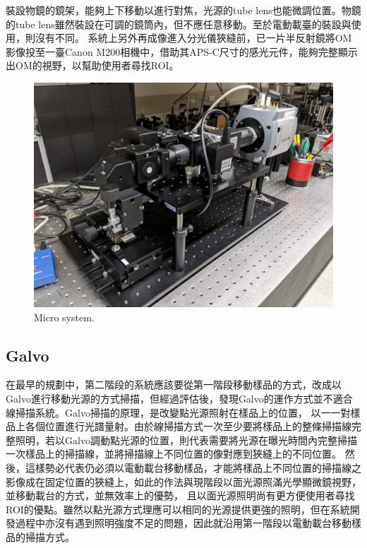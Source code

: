 \documentclass[12pt]{article}
\begin{document}
    裝設物鏡的鏡架，能夠上下移動以進行對焦，光源的tube lens也能微調位置。物鏡的tube lens雖然裝設在可調的鏡筒內，但不應任意移動。至於電動載臺的裝設與使用，則沒有不同。
    系統上另外再成像進入分光儀狹縫前，已一片半反射鏡將OM影像投至一臺Canon M200相機中，借助其APS-C尺寸的感光元件，能夠完整顯示出OM的視野，以幫助使用者尋找ROI。
    \begin{figure}
        \centering
        \includegraphics[width=\linewidth]{PXL_20210831_081957648.jpg}
        \caption{Micro system.}
    \end{figure}

    \subsection{Galvo}
    在最早的規劃中，第二階段的系統應該要從第一階段移動樣品的方式，改成以Galvo進行移動光源的方式掃描，但經過評估後，發現Galvo的運作方式並不適合線掃描系統。Galvo掃描的原理，是改變點光源照射在樣品上的位置，
    以一一對樣品上各個位置進行光譜量射。由於線掃描方式一次至少要將樣品上的整條掃描線完整照明，若以Galvo調動點光源的位置，則代表需要將光源在曝光時間內完整掃描一次樣品上的掃描線，並將掃描線上不同位置的像對應到狹縫上的不同位置。
    然後，這樣勢必代表仍必須以電動載台移動樣品，才能將樣品上不同位置的掃描線之影像成在固定位置的狹縫上，如此的作法與現階段以面光源照滿光學顯微鏡視野，並移動載台的方式，並無效率上的優勢，
    且以面光源照明尚有更方便使用者尋找ROI的優點。雖然以點光源方式理應可以相同的光源提供更強的照明，但在系統開發過程中亦沒有遇到照明強度不足的問題，因此就沿用第一階段以電動載台移動樣品的掃描方式。
\end{document}
